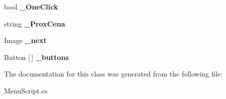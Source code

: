\begin{DoxyCompactItemize}
bool {\bfseries \+\_\+\+One\+Click}
\item 
\mbox{\label{class_menu_script_ad28acc9f1c2aeecd423e49955a5ffae0}} 
string {\bfseries \+\_\+\+Prox\+Cena}
\item 
\mbox{\label{class_menu_script_a2571fdf4c2f039b286c4bd5e0f608b21}} 
Image {\bfseries \+\_\+next}
\item 
\mbox{\label{class_menu_script_a7ecadb07a98acdeeb7edb34d6b7a1fe7}} 
Button \mbox{[}$\,$\mbox{]} {\bfseries \+\_\+buttons}
\end{DoxyCompactItemize}


The documentation for this class was generated from the following file\+:\begin{DoxyCompactItemize}
\item 
Menu\+Script.\+cs\end{DoxyCompactItemize}
